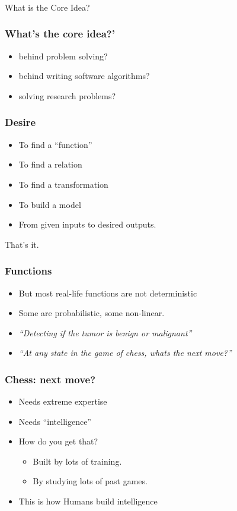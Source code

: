 \begin{frame}[fragile]\frametitle{}
\begin{center}
{\Large What is the Core Idea?}
\end{center}
\end{frame}


\begin{frame}[fragile]\frametitle{What's the core idea?'}
\begin{itemize}
\item behind problem solving?
\item behind writing software algorithms?
\item solving research problems?
\end{itemize}
\end{frame}

\begin{frame}[fragile]\frametitle{Desire}
\begin{itemize}
\item To find a ``function''
\item To find a relation
\item To find a transformation
\item To build a model
\item From given inputs to desired outputs.
\end{itemize}
That's it.
\end{frame}


\begin{frame}[fragile]\frametitle{Functions}
\begin{itemize}
\item But most real-life functions are not deterministic
\item Some are probabilistic, some non-linear.
\item {\em ``Detecting if the tumor is benign or malignant''}
\item {\em ``At any state in the game of chess, whats the next move?''}
\end{itemize}
\end{frame}

\begin{frame}[fragile]\frametitle{Chess: next move?}
\begin{itemize}
\item Needs extreme expertise
\item Needs ``intelligence''
\item How do you get that?
\begin{itemize}
\item Built by lots of training.
\item By studying lots of past games.
\end{itemize}
\item This is how Humans build intelligence
\end{itemize}
\end{frame}

